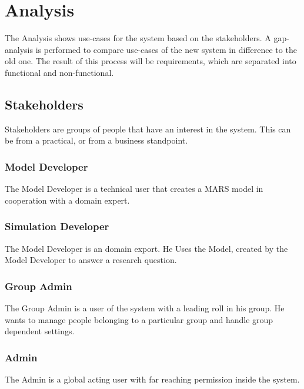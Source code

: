 
\chapter{Analysis}
The Analysis shows use-cases for the system based on the stakeholders. A gap-analysis is performed to compare use-cases of the new system in difference to the old one. The result of this process will be requirements, which are separated into functional and non-functional.


\section{Stakeholders}
Stakeholders are groups of people that have an interest in the system. This can be from a practical, or from a business standpoint. 

\subsection{Model Developer}
The Model Developer is a technical user that creates a MARS model in cooperation with a domain expert.

\subsection{Simulation Developer}
The Model Developer is an domain export. He Uses the Model, created by the Model Developer to answer a research question.

\subsection{Group Admin}
The Group Admin is a user of the system with a leading roll in his group. He wants to manage people belonging to a particular group and handle group dependent settings.

\subsection{Admin}
The Admin is a global acting user with far reaching permission inside the system.


